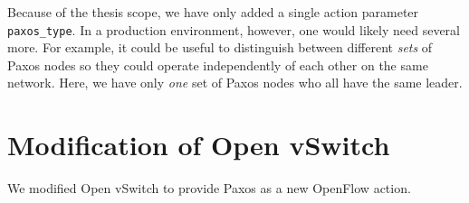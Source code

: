Because of the thesis scope, we have only added a single action parameter
\texttt{paxos\_type}.
%
In a production environment, however, one would likely need several more.
%
For example, it could be useful to distinguish between different
\textit{sets} of Paxos nodes so they could operate independently of each
other on the same network.
%
Here, we have only \textit{one} set of Paxos nodes who all have the same
leader.

\section{Modification of Open vSwitch}

We modified Open vSwitch to provide Paxos as a new OpenFlow action.

